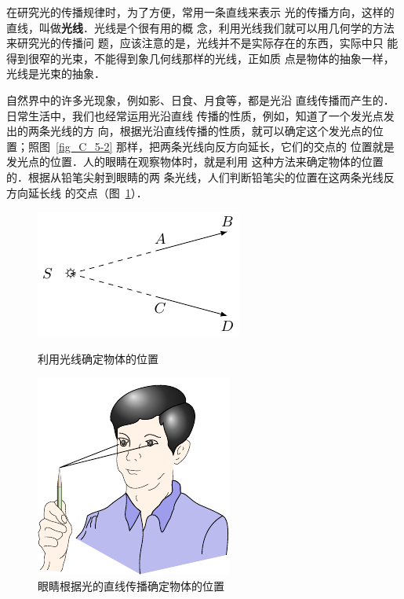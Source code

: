 在研究光的传播规律时，为了方便，常用一条直线来表示
光的传播方向，这样的直线，叫做\textbf{光线}．光线是个很有用的概
念，利用光线我们就可以用几何学的方法来研究光的传播问
题，应该注意的是，光线并不是实际存在的东西，实际中只
能得到很窄的光束，不能得到象几何线那样的光线，正如质
点是物体的抽象一样，光线是光束的抽象．

自然界中的许多光现象，例如影、日食、月食等，都是光沿
直线传播而产生的．日常生活中，我们也经常运用光沿直线
传播的性质，例如，知道了一个发光点发出的两条光线的方
向，根据光沿直线传播的性质，就可以确定这个发光点的位
置；照图~\ref{fig_C_5-2} 那样，把两条光线向反方向延长，它们的交点的
位置就是发光点的位置．人的眼睛在观察物体时，就是利用
这种方法来确定物体的位置的．根据从铅笔尖射到眼睛的两
条光线，人们判断铅笔尖的位置在这两条光线反方向延长线
的交点（图~\ref{fig_C_5-3}）．
\begin{figure}[htbp]
    \centering
    \begin{minipage}[t]{0.48\textwidth}
        \centering
        \includegraphics{fig/C/5-2.pdf}
        \caption{利用光线确定物体的位置}\label{fig_C_5-2}
    \end{minipage}
    \hfill
    \begin{minipage}[t]{0.48\textwidth}
        \centering
        \includegraphics{fig/C/5-3.pdf}
        \caption{眼睛根据光的直线传播确定物体的位置}\label{fig_C_5-3}
    \end{minipage}
\end{figure}

